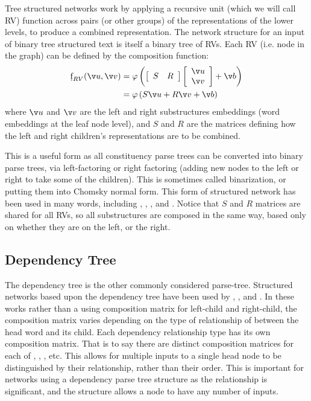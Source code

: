 {Tree structured networks work by applying a recursive unit (which we will call RV) function across pairs (or other groups) of the representations of the lower levels, to produce a combined representation.
The network structure for an input of binary tree structured text is itself a binary tree of RVs.
Each RV (i.e. node in the graph) can be defined by the composition function:
\begin{align}
\d f_{RV}(\v u, \v v) &= \varphi\left(\left[\begin{array}{cc}
S & R\end{array}\right]\left[\begin{array}{c}
\v u\\
\v v
\end{array}\right] + \v b \right) \\ \label{equ:rnn1}
&= \varphi\left( S\v u +R\v v + \v b \right)
\end{align}
where $\v u$ and $\v v$ are the left and right substructures embeddings (word embeddings at the leaf node level), and $S$ and $R$ are the matrices defining how the left and right children's representations are to be combined.


This is a useful form as all constituency parse trees can be converted into binary parse trees, via left-factoring or right factoring (adding new nodes to the left or right to take some of the children).
This is sometimes called binarization, or putting them into  Chomsky normal form.
This form of structured network has been used in many words, including , \textcite{SocherEtAl2011:RAE},  \textcite{SocherEtAl2011:PoolRAE},
\textcite{Socher2011ParsingPhrases} and \textcite{zhang2014BRAE}.
Notice that $S$ and $R$ matrices are shared for all RVs, so all substructures are composed in the same way, based only on whether they are on the left, or the right.


\subsection{Dependency Tree}\label{sec:dependency-tree}
The dependency tree is the other commonly considered parse-tree.
Structured networks based upon the dependency tree have been used by , , and .
In these works rather than a using composition matrix for left-child and right-child,
the composition matrix varies depending on the type of relationship of between the head word and its child.
Each dependency relationship type has its own composition matrix.
That is to say there are distinct composition matrices for each of
, , ,  etc.
This allows for multiple inputs to a single head node to be distinguished by their relationship, rather than their order.
This is important for networks using a dependency parse tree structure as the relationship is significant, and the structure allows a node to have any number of inputs.



}

